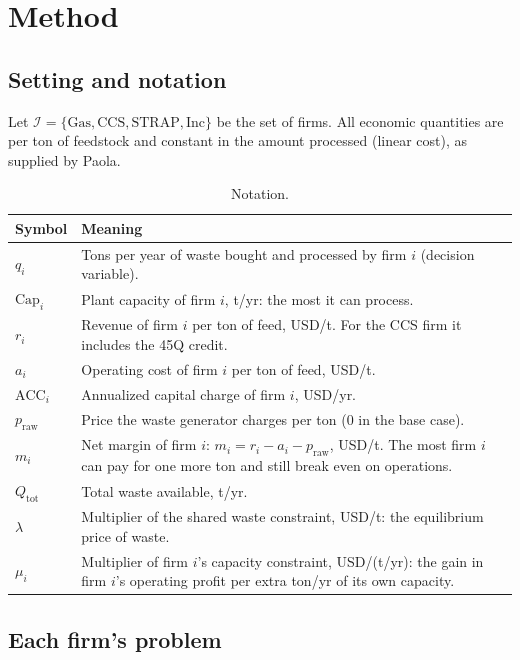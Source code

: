 \documentclass[11pt]{article}
\newcommand{\usd}{USD}
\newcommand{\gas}{\mathrm{Gas}}
\newcommand{\ccs}{\mathrm{CCS}}
\newcommand{\strap}{\mathrm{STRAP}}
\newcommand{\inc}{\mathrm{Inc}}
\begin{document}
\section{Method}
\label{sec:method}

\subsection{Setting and notation}

Let $\mathcal I=\{\gas,\ccs,\strap,\inc\}$ be the set of firms. All economic
quantities are per ton of feedstock and constant in the amount processed (linear
cost), as supplied by Paola.

\begin{table}[h]
\centering
\caption{Notation.}
\label{tab:notation}
\small
\renewcommand{\arraystretch}{1.2}
\begin{tabular}{@{}>{\raggedright\arraybackslash}p{2.4cm}>{\raggedright\arraybackslash}p{12.5cm}@{}}
\toprule
\textbf{Symbol} & \textbf{Meaning} \\
\midrule
$q_i$ & Tons per year of waste bought and processed by firm $i$ (decision variable). \\
$\mathrm{Cap}_i$ & Plant capacity of firm $i$, t/yr: the most it can process. \\
$r_i$ & Revenue of firm $i$ per ton of feed, \usd/t. For the CCS firm it includes the 45Q credit. \\
$a_i$ & Operating cost of firm $i$ per ton of feed, \usd/t. \\
$\mathrm{ACC}_i$ & Annualized capital charge of firm $i$, \usd/yr. \\
$p_{\mathrm{raw}}$ & Price the waste generator charges per ton (0 in the base case). \\
$m_i$ & Net margin of firm $i$: $m_i=r_i-a_i-p_{\mathrm{raw}}$, \usd/t. The most firm $i$ can pay for one more ton and still break even on operations. \\
$Q_{\mathrm{tot}}$ & Total waste available, t/yr. \\
$\lambda$ & Multiplier of the shared waste constraint, \usd/t: the equilibrium price of waste. \\
$\mu_i$ & Multiplier of firm $i$'s capacity constraint, \usd/(t/yr): the gain in firm $i$'s operating profit per extra ton/yr of its own capacity. \\
\bottomrule
\end{tabular}
\end{table}

\subsection{Each firm's problem}
\end{document}
